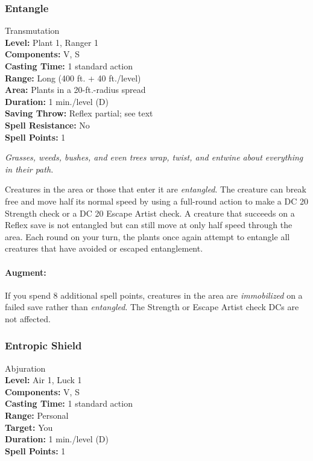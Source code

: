 \subsubsection{Entangle}
\label{Spell:Entangle}
Transmutation
\\ \textbf{Level:} Plant 1, Ranger 1
\\ \textbf{Components:} V, S
\\ \textbf{Casting Time:} 1 standard action
\\ \textbf{Range:} Long (400 ft. + 40 ft./level)
\\ \textbf{Area:} Plants in a 20-ft.-radius spread
\\ \textbf{Duration:} 1 min./level (D)
\\ \textbf{Saving Throw:} Reflex partial; see text
\\ \textbf{Spell Resistance:} No
\\ \textbf{Spell Points:} 1

\emph{Grasses, weeds, bushes, and even trees wrap, twist, and entwine about everything in their path.} 

Creatures in the area or those that enter it are \emph{entangled}.
The creature can break free and move half its normal speed by using a full-round action to make a DC 20 Strength check or a DC 20 Escape Artist check. 
A creature that succeeds on a Reflex save is not entangled but can still move at only half speed through the area. 
Each round on your turn, the plants once again attempt to entangle all creatures that have avoided or escaped entanglement.

\paragraph{Augment:} If you spend 8 additional spell points, creatures in the area are \emph{immobilized} on a failed save rather than \emph{entangled}. The Strength or Escape Artist check DCs are not affected.
\subsubsection{Entropic Shield}
\label{Spell:EntropicShield}
Abjuration
\\ \textbf{Level:} Air 1, Luck 1
\\ \textbf{Components:} V, S
\\ \textbf{Casting Time:} 1 standard action
\\ \textbf{Range:} Personal
\\ \textbf{Target:} You
\\ \textbf{Duration:} 1 min./level (D)
\\ \textbf{Spell Points:} 1

